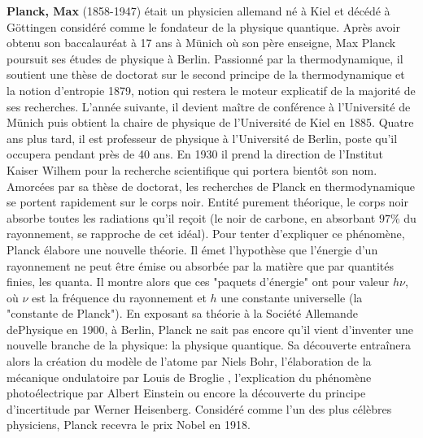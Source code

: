 \textbf{Planck, Max} (1858-1947) était un physicien allemand né à Kiel et décédé à Göttingen considéré comme le fondateur de la physique quantique. Après avoir obtenu son baccalauréat à 17 ans à Münich où son père enseigne, Max Planck poursuit ses études de physique à Berlin. Passionné par la thermodynamique, il soutient une thèse de doctorat sur le second principe de la thermodynamique et la notion d'entropie 1879, notion qui restera le moteur explicatif de la majorité de ses recherches. L'année suivante, il devient maître de conférence à l'Université de Münich puis obtient la chaire de physique de l'Université de Kiel en 1885. Quatre ans plus tard, il est professeur de physique à l'Université de Berlin, poste qu'il occupera pendant près de 40 ans. En 1930 il prend la direction de l'Institut Kaiser Wilhem pour la recherche scientifique qui portera bientôt son nom. Amorcées par sa thèse de doctorat, les recherches de Planck en thermodynamique se portent rapidement sur le corps noir. Entité purement théorique, le corps noir absorbe toutes les radiations qu'il reçoit (le noir de carbone, en absorbant $97\%$ du rayonnement, se rapproche de cet idéal). Pour tenter d'expliquer ce phénomène, Planck élabore une nouvelle théorie. Il émet l'hypothèse que l'énergie d'un rayonnement ne peut être émise ou absorbée par la matière que par quantités finies, les quanta. Il montre alors que ces "paquets d'énergie" ont pour valeur $h \nu$, où $\nu$ est la fréquence du rayonnement et $h$ une constante universelle (la "constante de Planck"). En exposant sa théorie à la Société Allemande dePhysique en 1900, à Berlin, Planck ne sait pas encore qu'il vient d'inventer une nouvelle branche de la physique: la physique quantique. Sa découverte entraînera alors la création du modèle de l'atome par Niels Bohr, l'élaboration de la mécanique ondulatoire par Louis de Broglie , l'explication du phénomène photoélectrique par Albert Einstein ou encore la découverte du principe d'incertitude par Werner Heisenberg. Considéré comme l'un des plus célèbres physiciens, Planck recevra le prix Nobel en 1918.

